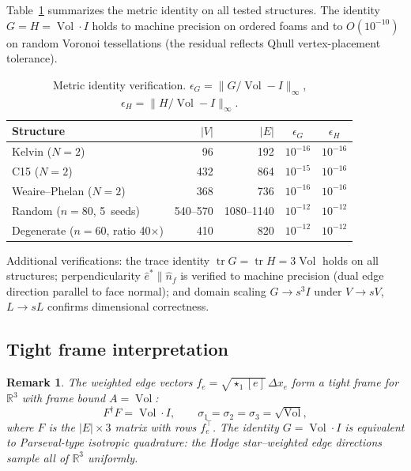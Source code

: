 \documentclass[preprint,12pt]{elsarticle}
\newtheorem{remark}{Remark}[section]
\DeclareMathOperator{\Vol}{Vol}
\DeclareMathOperator{\tr}{tr}
\begin{document}
Table~\ref{tab:metric} summarizes the metric identity on all tested
structures. The identity $G = H = \Vol \cdot I$ holds to machine precision
on ordered foams and to $O(10^{-10})$ on random Voronoi tessellations (the
residual reflects Qhull vertex-placement tolerance).

\begin{table}[ht]
\centering
\caption{Metric identity verification. $\epsilon_G = \|G/\Vol - I\|_\infty$,
$\epsilon_H = \|H/\Vol - I\|_\infty$.}
\label{tab:metric}
\begin{tabular}{lrrcc}
\toprule
Structure & $|V|$ & $|E|$ & $\epsilon_G$ & $\epsilon_H$ \\
\midrule
Kelvin ($N\!=\!2$) & 96 & 192 & $10^{-16}$ & $10^{-16}$ \\
C15 ($N\!=\!2$) & 432 & 864 & $10^{-15}$ & $10^{-16}$ \\
Weaire--Phelan ($N\!=\!2$) & 368 & 736 & $10^{-16}$ & $10^{-16}$ \\
Random ($n\!=\!80$, 5~seeds) & 540--570 & 1080--1140
  & $10^{-12}$ & $10^{-12}$ \\
Degenerate ($n\!=\!60$, ratio 40$\times$) & 410 & 820 & $10^{-12}$ & $10^{-12}$ \\
\bottomrule
\end{tabular}
\end{table}

Additional verifications:
the trace identity $\tr G = \tr H = 3\Vol$ holds on all structures;
perpendicularity $\hat{e}^* \parallel \hat{n}_f$ is verified to machine precision
(dual edge direction parallel to face normal);
and domain scaling $G \to s^3 I$ under $V \to sV$, $L \to sL$ confirms
dimensional correctness.

\subsection{Tight frame interpretation}
\label{sec:tight_frame}

\begin{remark}
The weighted edge vectors $f_e = \sqrt{\star_1[e]}\, \Delta x_e$ form a
tight frame for~$\mathbb{R}^3$ with frame bound $A = \Vol$:
\begin{equation}
  F^\dagger F = \Vol \cdot I, \qquad
  \sigma_1 = \sigma_2 = \sigma_3 = \sqrt{\Vol},
\end{equation}
where $F$ is the $|E| \times 3$ matrix with rows $f_e^\top$.
The identity $G = \Vol \cdot I$ is equivalent to Parseval-type isotropic
quadrature: the Hodge star--weighted edge directions sample all of
$\mathbb{R}^3$ uniformly.
\end{remark}
\end{document}
